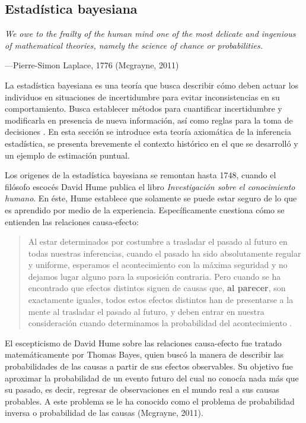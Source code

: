 \documentclass[11pt,a4paper]{article}
\begin{document}
\subsection{Estadística bayesiana}
\label{sec:bayesiana}
\epigraph{\itshape We owe to the frailty of the human mind one of the most delicate and ingenious of mathematical theories, namely the science of chance or probabilities.}{---Pierre-Simon Laplace, 1776 (Mcgrayne, 2011)}

La estadística bayesiana es una teoría que busca describir cómo deben actuar los individuos en situaciones de incertidumbre para evitar inconsistencias en su comportamiento. Busca establecer métodos para cuantificar incertidumbre y modificarla en presencia de nueva información, así como reglas para la toma de decisiones \citep{bernardo}.  En esta sección se introduce esta teoría axiomática de la inferencia estadística, se presenta brevemente el contexto histórico en el que se desarrolló y un ejemplo de estimación puntual.

Los origenes de la estadística bayesiana se remontan hasta 1748, cuando el filósofo escocés David Hume publica el libro \textit{Investigación sobre el conocimiento humano}. En éste, Hume establece que solamente se puede estar seguro de lo que es aprendido por medio de la experiencia. Específicamente cuestiona cómo se entienden las relaciones causa-efecto:

\begin{quotation}
Al estar determinados por costumbre a trasladar el pasado al futuro en todas nuestras inferencias, cuando el pasado ha sido absolutamente regular y uniforme, esperamos el acontecimiento con la máxima seguridad y no dejamos lugar alguno para la suposición contraria. Pero cuando se ha encontrado que efectos distintos siguen de causas que, \textbf{al parecer}, son exactamente iguales, todos estos efectos distintos han de presentarse a la mente al trasladar el pasado al futuro, y deben entrar en nuestra consideración cuando determinamos la probabilidad del acontecimiento \citep{hume}.
\end{quotation}

El escepticismo de David Hume sobre las relaciones causa-efecto fue tratado matemáticamente por Thomas Bayes, quien buscó la manera de describir las probabilidades de las causas a partir de sus efectos observables. Su objetivo fue aproximar la probabilidad de un evento futuro del cual no conocía nada más que su pasado, es decir, regresar de observaciones en el mundo real a sus causas probables. A este problema se le ha conocido como el problema de probabilidad inversa o probabilidad de las causas  (Mcgrayne, 2011).
\end{document}
